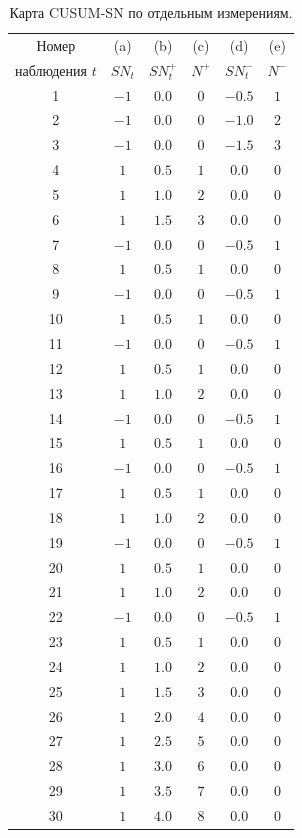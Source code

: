 \begin{table}[!ht]
	\centering
	\caption{Карта CUSUM-SN по отдельным измерениям.}
	\label{tab:4.8}
	\small
	\begin{tabular}{@{}cccccc@{}}\toprule
		Номер & (a) & (b) & (c) & (d) & (e) \\
		наблюдения \(t\) & \(SN_t\) & \(SN_t^+\) & \(N^+\) & \(SN_t^-\) & \(N^-\) \\ \midrule
		1 & \(-1\) & \(0.0\) & \(0\) & \(-0.5\) & \(1\) \\
		2 & \(-1\) & \(0.0\) & \(0\) & \(-1.0\) & \(2\) \\
		3 & \(-1\) & \(0.0\) & \(0\) & \(-1.5\) & \(3\) \\
		4 & \(1\) & \(0.5\) & \(1\) & \(0.0\) & \(0\) \\
		5 & \(1\) & \(1.0\) & \(2\) & \(0.0\) & \(0\) \\
		6 & \(1\) & \(1.5\) & \(3\) & \(0.0\) & \(0\) \\
		7 & \(-1\) & \(0.0\) & \(0\) & \(-0.5\) & \(1\) \\
		8 & \(1\) & \(0.5\) & \(1\) & \(0.0\) & \(0\) \\
		9 & \(-1\) & \(0.0\) & \(0\) & \(-0.5\) & \(1\) \\
		10 & \(1\) & \(0.5\) & \(1\) & \(0.0\) & \(0\) \\
		11 & \(-1\) & \(0.0\) & \(0\) & \(-0.5\) & \(1\) \\
		12 & \(1\) & \(0.5\) & \(1\) & \(0.0\) & \(0\) \\
		13 & \(1\) & \(1.0\) & \(2\) & \(0.0\) & \(0\) \\
		14 & \(-1\) & \(0.0\) & \(0\) & \(-0.5\) & \(1\) \\
		15 & \(1\) & \(0.5\) & \(1\) & \(0.0\) & \(0\) \\
		16 & \(-1\) & \(0.0\) & \(0\) & \(-0.5\) & \(1\) \\
		17 & \(1\) & \(0.5\) & \(1\) & \(0.0\) & \(0\) \\
		18 & \(1\) & \(1.0\) & \(2\) & \(0.0\) & \(0\) \\
		19 & \(-1\) & \(0.0\) & \(0\) & \(-0.5\) & \(1\) \\
		20 & \(1\) & \(0.5\) & \(1\) & \(0.0\) & \(0\) \\
		21 & \(1\) & \(1.0\) & \(2\) & \(0.0\) & \(0\) \\
		22 & \(-1\) & \(0.0\) & \(0\) & \(-0.5\) & \(1\) \\
		23 & \(1\) & \(0.5\) & \(1\) & \(0.0\) & \(0\) \\
		24 & \(1\) & \(1.0\) & \(2\) & \(0.0\) & \(0\) \\
		25 & \(1\) & \(1.5\) & \(3\) & \(0.0\) & \(0\) \\
		26 & \(1\) & \(2.0\) & \(4\) & \(0.0\) & \(0\) \\
		27 & \(1\) & \(2.5\) & \(5\) & \(0.0\) & \(0\) \\
		28 & \(1\) & \(3.0\) & \(6\) & \(0.0\) & \(0\) \\
		29 & \(1\) & \(3.5\) & \(7\) & \(0.0\) & \(0\) \\
		30 & \(1\) & \(4.0\) & \(8\) & \(0.0\) & \(0\) \\ \bottomrule
	\end{tabular}
\end{table}

